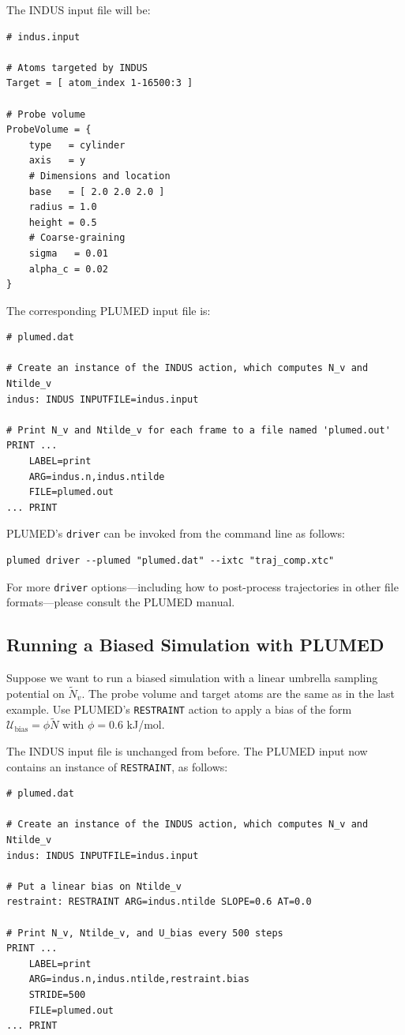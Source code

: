 \documentclass[11pt,notitlepage]{article}
\begin{document}
The INDUS input file will be:
\begin{lstlisting}
# indus.input

# Atoms targeted by INDUS
Target = [ atom_index 1-16500:3 ]

# Probe volume
ProbeVolume = {
	type   = cylinder
	axis   = y
	# Dimensions and location
	base   = [ 2.0 2.0 2.0 ]
	radius = 1.0
	height = 0.5
	# Coarse-graining
	sigma   = 0.01
	alpha_c = 0.02
}
\end{lstlisting}

\noindent The corresponding PLUMED input file is:
\begin{lstlisting}
# plumed.dat

# Create an instance of the INDUS action, which computes N_v and Ntilde_v
indus: INDUS INPUTFILE=indus.input

# Print N_v and Ntilde_v for each frame to a file named 'plumed.out'
PRINT ...
	LABEL=print
	ARG=indus.n,indus.ntilde
	FILE=plumed.out
... PRINT
\end{lstlisting}


PLUMED's \texttt{driver} can be invoked from the command line as follows:

\begin{lstlisting}
plumed driver --plumed "plumed.dat" --ixtc "traj_comp.xtc"
\end{lstlisting}

For more \texttt{driver} options---including how to post-process trajectories in other file formats---please consult the PLUMED manual.


\subsection{Running a Biased Simulation with PLUMED}

Suppose we want to run a biased simulation with a linear umbrella sampling potential on $\tilde{N}_v$. The probe volume and target atoms are the same as in the last example. Use PLUMED's \texttt{RESTRAINT} action to apply a bias of the form $\mathcal{U}_{\text{bias}} = \phi \tilde{N}$ with $\phi = 0.6$ kJ/mol.

The INDUS input file is unchanged from before. The PLUMED input now contains an instance of \texttt{RESTRAINT}, as follows:
\begin{lstlisting}
# plumed.dat

# Create an instance of the INDUS action, which computes N_v and Ntilde_v
indus: INDUS INPUTFILE=indus.input

# Put a linear bias on Ntilde_v
restraint: RESTRAINT ARG=indus.ntilde SLOPE=0.6 AT=0.0

# Print N_v, Ntilde_v, and U_bias every 500 steps
PRINT ...
	LABEL=print
	ARG=indus.n,indus.ntilde,restraint.bias
	STRIDE=500
	FILE=plumed.out
... PRINT
\end{lstlisting}
\end{document}

